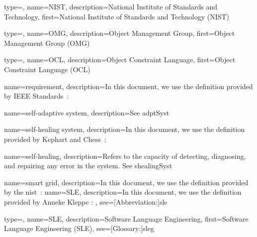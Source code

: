 {
	type=\acronymtype,
	name={NIST},
	description={National Institute of Standards and Technology},
	first={National Institute of Standards and Technology (NIST)}
}

{
	type=\acronymtype,
	name={OMG},
	description={Object Management Group},
	first={Object Management Group (OMG)}
}

{
	type=\acronymtype,
	name={OCL},
	description={Object Constraint Language},
	first={Object Constraint Language (OCL)}
}


{
	name={requirement},
	description={In this document, we use the definition provided by IEEE Standards~\cite{iso2017systems}: }
}

{
	name={self-adaptive system},
	description={See \gls{adptSyst}}
}

{
	name={self-healing system},
	description={In this document, we use the definition provided by Kephart and Chess~\cite{DBLP:journals/computer/KephartC03}: }
}

{
	name={self-healing},
	description={Refers to the capacity of detecting, diagnosing, and repairing any error in the system. See \gls{shealingSyst}}
}

{
	name={smart grid},
	description={In this document, we use the definition provided by the \gls{nist}~\cite{NIST:SmartGrid:Def:What}: }
}
{
	name={SLE},
 	description={In this document, we use the definition provided by Anneke Kleppe \cite{kleppe2008software}: },
 	see=[Abbreviation:]{sle}
}

{
	type=\acronymtype,
	name={SLE},
	description={Software Language Engineering},
	first={Software Language Engineering (SLE)},
	see=[Glossary:]{sleg}
}

